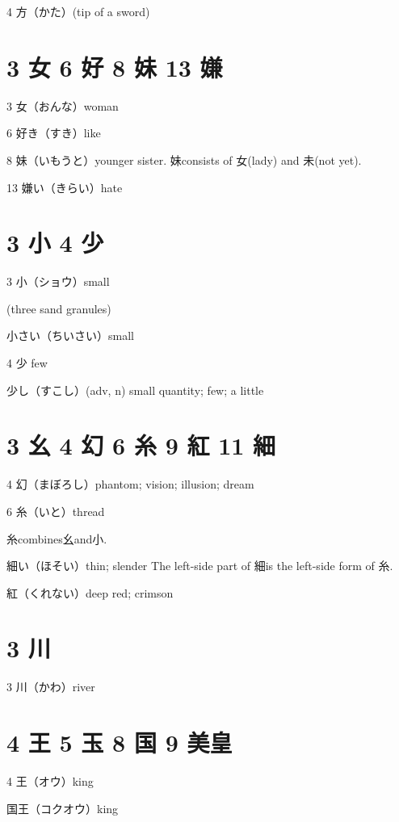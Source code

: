4 方（かた）(tip of a sword)





\section{3 女 6 好 8 妹 13 嫌}

3 女（おんな）woman

6 好き（すき）like

8 妹（いもうと）younger sister.
妹consists of 女(lady) and 未(not yet).

13 嫌い（きらい）hate

\section{3 小 4 少}

3 小（ショウ）small

(three sand granules)

小さい（ちいさい）small

4 少 few

少し（すこし）(adv, n) small quantity; few; a little

\section{3 幺 4 幻 6 糸 9 紅 11 細}

4 幻（まぼろし）phantom; vision; illusion; dream

6 糸（いと）thread

糸combines幺and小.

細い（ほそい）thin; slender
The left-side part of 細is the left-side form of 糸.

紅（くれない）deep red; crimson

\section{3 川}

3 川（かわ）river






\section{4 王 5 玉 8 国 9 美皇}

4 王（オウ）king

国王（コクオウ）king

